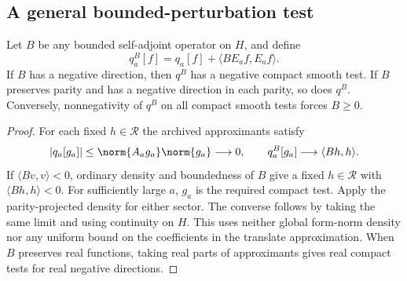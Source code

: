 \subsection*{A general bounded-perturbation test}
\begin{lemma}\label{lem:ns57-bounded-detection}
Let $B$ be any bounded self-adjoint operator on $H$, and define
\[
 q_a^B[f]=q_a[f]+\langle BE_af,E_af\rangle.
\]
If $B$ has a negative direction, then $q^B$ has a negative compact
smooth test. If $B$ preserves parity and has a negative direction
in each parity, so does $q^B$. Conversely, nonnegativity of $q^B$
on all compact smooth tests forces $B\ge0$.
\end{lemma}
\begin{proof}
For each fixed $h\in\mathcal R$ the archived approximants satisfy
\[
 |q_a[g_a]|\le\norm{A_ag_a}\norm{g_a}\longrightarrow0,
 \qquad q_a^B[g_a]\longrightarrow\langle Bh,h\rangle.
\]
If $\langle Bv,v\rangle<0$, ordinary density and boundedness of $B$
give a fixed $h\in\mathcal R$ with $\langle Bh,h\rangle<0$.
For sufficiently large $a$, $g_a$ is the required compact test.
Apply the parity-projected density for either sector. The converse
follows by taking the same limit and using continuity on $H$.
This uses neither global form-norm density nor any uniform bound
on the coefficients in the translate approximation.
When $B$ preserves real functions, taking real parts of approximants
gives real compact tests for real negative directions.
\end{proof}

